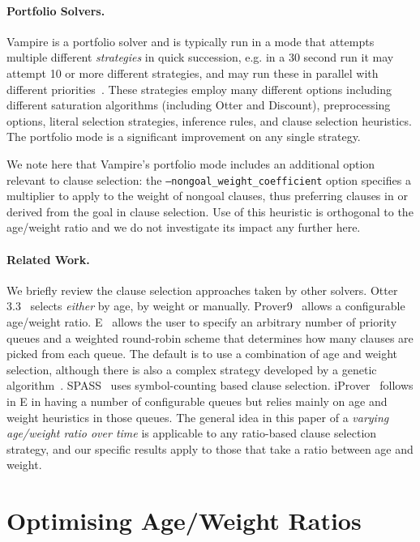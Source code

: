 \documentclass{llncs}
\begin{document}
\paragraph{Portfolio Solvers.}

Vampire is a portfolio solver and is typically run in a mode that attempts multiple different \emph{strategies} in quick succession, e.g. in a 30 second run it may attempt 10 or more different strategies, and may run these in parallel with different priorities~\cite{dynamic-strategy-priority}. These strategies employ many different options including different saturation algorithms (including Otter and Discount), preprocessing options, literal selection strategies, inference rules, and clause selection heuristics. The portfolio mode is a significant improvement on any single strategy. 

We note here that Vampire's portfolio mode includes an additional option relevant to clause selection: the \texttt{--nongoal\_weight\_coefficient} option specifies a multiplier to apply to the weight of nongoal clauses, thus preferring clauses in or derived from the goal in clause selection. Use of this heuristic is orthogonal to the age/weight ratio and we do not investigate its impact any further here.

\paragraph{Related Work.}
We briefly review the clause selection approaches taken by other solvers. 
Otter 3.3~\cite{otter3} selects \emph{either} by age, by weight or manually.
Prover9~\cite{prover9} allows a configurable age/weight ratio.
E~\cite{E} allows the user to specify an arbitrary number of priority queues and a weighted round-robin scheme that determines how many clauses are picked from each queue.
The default is to use a combination of age and weight selection, although there is also a complex strategy developed by a genetic algorithm~\cite{genetic-heuristics}. 
SPASS~\cite{Spass} uses symbol-counting based clause selection. 
iProver~\cite{Iprover} follows in E in having a number of configurable queues but relies mainly on age and weight heuristics in those queues. 
The general idea in this paper of a \emph{varying age/weight ratio over time} is applicable to any ratio-based clause selection strategy, and our specific results apply to those that take a ratio between age and weight.

\section{Optimising Age/Weight Ratios}
\label{sec:awr:study}
\end{document}

